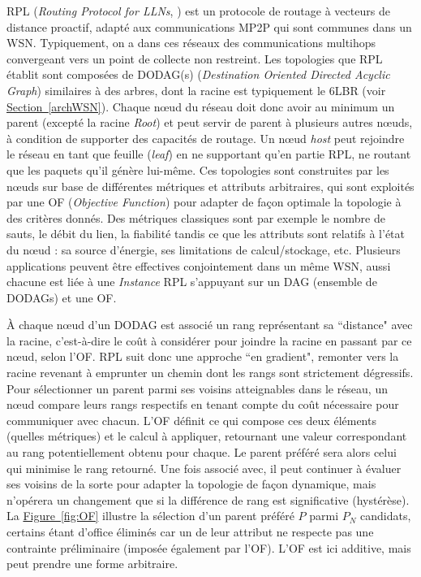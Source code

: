 \documentclass[]{report}
\newcommand{\wordlink}[2]{\hyperref[#2]{#1~\ref{#2}}}
\begin{document}
\par RPL (\textit{Routing Protocol for LLNs}, \cite{rfc6550}) est un protocole de routage à vecteurs de distance proactif, adapté aux communications MP2P qui sont communes dans un WSN. Typiquement, on a dans ces réseaux des communications multihops convergeant vers un point de collecte non restreint. Les topologies que RPL établit sont composées de DODAG(s) (\textit{Destination Oriented Directed Acyclic Graph}) similaires à des arbres, dont la racine est typiquement le 6LBR (voir \wordlink{Section}{archWSN}). Chaque nœud du réseau doit donc avoir au minimum un parent (excepté la racine \textit{Root}) et peut servir de parent à plusieurs autres nœuds, à condition de supporter des capacités de routage. Un nœud \textit{host} peut rejoindre le réseau en tant que feuille (\textit{leaf}) en ne supportant qu'en partie RPL, ne routant que les paquets qu'il génère lui-même. Ces topologies sont construites par les nœuds sur base de différentes métriques et attributs arbitraires, qui sont exploités par une OF (\textit{Objective Function}) pour adapter de façon optimale la topologie à des critères donnés. Des métriques classiques sont par exemple le nombre de sauts, le débit du lien, la fiabilité tandis ce que les attributs sont relatifs à l'état du nœud : sa source d'énergie, ses limitations de calcul/stockage, etc. Plusieurs applications peuvent être effectives conjointement dans un même WSN, aussi chacune est liée à une \textit{Instance} RPL s'appuyant sur un DAG (ensemble de DODAGs) et une OF.\\

\par À chaque nœud d'un DODAG est associé un rang représentant sa ``distance" avec la racine, c'est-à-dire le coût à considérer pour joindre la racine en passant par ce nœud, selon l'OF. RPL suit donc une approche ``en gradient", remonter vers la racine revenant à emprunter un chemin dont les rangs sont strictement dégressifs. Pour sélectionner un parent parmi ses voisins atteignables dans le réseau, un nœud compare leurs rangs respectifs en tenant compte du coût nécessaire pour communiquer avec chacun. L'OF définit ce qui compose ces deux éléments (quelles métriques) et le calcul à appliquer, retournant une valeur correspondant au rang potentiellement obtenu pour chaque. Le parent préféré sera alors celui qui minimise le rang retourné. Une fois associé avec, il peut continuer à évaluer ses voisins de la sorte pour adapter la topologie de façon dynamique, mais n'opérera un changement que si la différence de rang est significative (hystérèse). La \wordlink{Figure}{fig:OF} illustre la sélection d'un parent préféré $P$ parmi $P_N$ candidats, certains étant d'office éliminés car un de leur attribut ne respecte pas une contrainte préliminaire (imposée également par l'OF). L'OF est ici additive, mais peut prendre une forme arbitraire.
\end{document}
